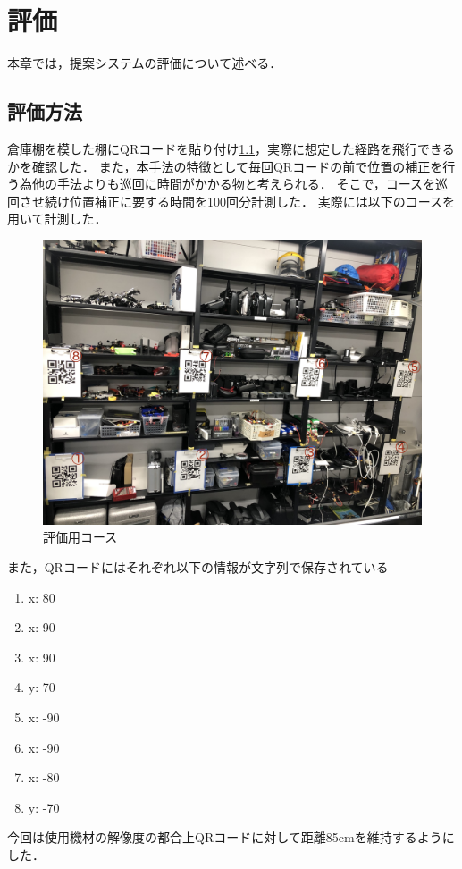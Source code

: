 \chapter{評価}
\label{evaluation}
本章では，提案システムの評価について述べる．

\section{評価方法}
倉庫棚を模した棚にQRコードを貼り付け\ref{course}，実際に想定した経路を飛行できるかを確認した．
また，本手法の特徴として毎回QRコードの前で位置の補正を行う為他の手法よりも巡回に時間がかかる物と考えられる．
そこで，コースを巡回させ続け位置補正に要する時間を100回分計測した．
実際には以下のコースを用いて計測した．


\begin{figure}[htbp]
  \begin{center}
    \includegraphics[clip,width=15.0cm]{img/course.jpg}
    \caption{評価用コース}
    \label{course}
  \end{center}
\end{figure}

また，QRコードにはそれぞれ以下の情報が文字列で保存されている
\begin{enumerate}
    \item {x: 80}
    \item {x: 90}
    \item {x: 90}
    \item {y: 70}
    \item {x: -90}
    \item {x: -90}
    \item {x: -80}
    \item {y: -70}
\end{enumerate}

今回は使用機材の解像度の都合上QRコードに対して距離85cmを維持するようにした．



